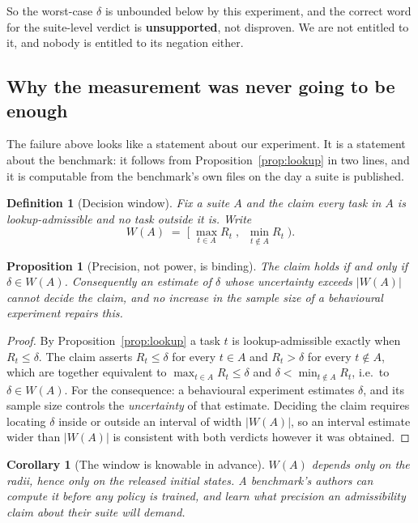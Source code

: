 \documentclass[10pt,twocolumn]{article}
\newtheorem{definition}{Definition}
\newtheorem{proposition}{Proposition}
\newtheorem{corollary}{Corollary}
\begin{document}
So the worst-case $\delta$ is unbounded below by this experiment, and the
correct word for the suite-level verdict is \textbf{unsupported}, not
disproven. We are not entitled to it, and nobody is entitled to its negation
either.

\subsection{Why the measurement was never going to be enough}
\label{sec:window}

The failure above looks like a statement about our experiment. It is a
statement about the benchmark: it follows from Proposition~\ref{prop:lookup} in
two lines, and it is computable from the benchmark's own files on the day a
suite is published.

\begin{definition}[Decision window]
\label{def:window}
Fix a suite $A$ and the claim \emph{every task in $A$ is lookup-admissible and
no task outside it is}. Write
\[
  W(A) \;=\; \Big[\; \max_{t \in A} R_t \;,\;\; \min_{t \notin A} R_t \;\Big).
\]
\end{definition}

\begin{proposition}[Precision, not power, is binding]
\label{prop:window}
The claim holds if and only if $\delta \in W(A)$. Consequently an estimate of
$\delta$ whose uncertainty exceeds $|W(A)|$ cannot decide the claim, and no
increase in the sample size of a behavioural experiment repairs this.
\end{proposition}

\begin{proof}
By Proposition~\ref{prop:lookup} a task $t$ is lookup-admissible exactly when
$R_t \le \delta$. The claim asserts $R_t \le \delta$ for every $t \in A$ and
$R_t > \delta$ for every $t \notin A$, which are together equivalent to
$\max_{t \in A} R_t \le \delta$ and $\delta < \min_{t \notin A} R_t$, i.e.\ to
$\delta \in W(A)$. For the consequence: a behavioural experiment estimates
$\delta$, and its sample size controls the \emph{uncertainty} of that estimate.
Deciding the claim requires locating $\delta$ inside or outside an interval of
width $|W(A)|$, so an interval estimate wider than $|W(A)|$ is consistent with
both verdicts however it was obtained.
\end{proof}

\begin{corollary}[The window is knowable in advance]
\label{cor:window}
$W(A)$ depends only on the radii, hence only on the released initial states. A
benchmark's authors can compute it before any policy is trained, and learn what
precision an admissibility claim about their suite will demand.
\end{corollary}
\end{document}
